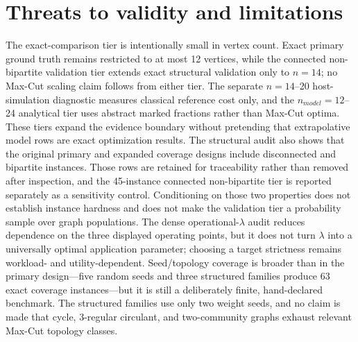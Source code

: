 \documentclass[5p,times]{elsarticle}
\begin{document}
\section{Threats to validity and limitations}
The exact-comparison tier is intentionally small in vertex count. Exact primary ground truth remains restricted to at most 12 vertices, while the connected non-bipartite validation tier extends exact structural validation only to $n=14$; no Max-Cut scaling claim follows from either tier. The separate $n=14$--20 host-simulation diagnostic measures classical reference cost only, and the $n_{model}=12$--24 analytical tier uses abstract marked fractions rather than Max-Cut optima. These tiers expand the evidence boundary without pretending that extrapolative model rows are exact optimization results. The structural audit also shows that the original primary and expanded coverage designs include disconnected and bipartite instances. Those rows are retained for traceability rather than removed after inspection, and the 45-instance connected non-bipartite tier is reported separately as a sensitivity control. Conditioning on those two properties does not establish instance hardness and does not make the validation tier a probability sample over graph populations. The dense operational-$\lambda$ audit reduces dependence on the three displayed operating points, but it does not turn $\lambda$ into a universally optimal application parameter; choosing a target strictness remains workload- and utility-dependent. Seed/topology coverage is broader than in the primary design---five random seeds and three structured families produce 63 exact coverage instances---but it is still a deliberately finite, hand-declared benchmark. The structured families use only two weight seeds, and no claim is made that cycle, 3-regular circulant, and two-community graphs exhaust relevant Max-Cut topology classes.
\end{document}
